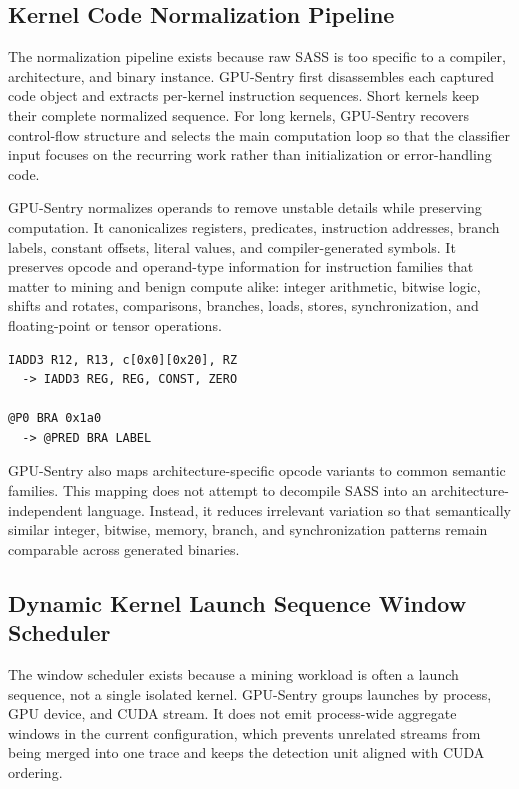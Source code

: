 \subsection{Kernel Code Normalization Pipeline}
\label{sec:normalization}

The normalization pipeline exists because raw SASS is too specific to a compiler, architecture, and binary instance. GPU-Sentry first disassembles each captured code object and extracts per-kernel instruction sequences. Short kernels keep their complete normalized sequence. For long kernels, GPU-Sentry recovers control-flow structure and selects the main computation loop so that the classifier input focuses on the recurring work rather than initialization or error-handling code.

GPU-Sentry normalizes operands to remove unstable details while preserving computation. It canonicalizes registers, predicates, instruction addresses, branch labels, constant offsets, literal values, and compiler-generated symbols. It preserves opcode and operand-type information for instruction families that matter to mining and benign compute alike: integer arithmetic, bitwise logic, shifts and rotates, comparisons, branches, loads, stores, synchronization, and floating-point or tensor operations.

\begin{lstlisting}[caption={Example of SASS normalization.},label={lst:normalization}]
IADD3 R12, R13, c[0x0][0x20], RZ
  -> IADD3 REG, REG, CONST, ZERO

@P0 BRA 0x1a0
  -> @PRED BRA LABEL
\end{lstlisting}

GPU-Sentry also maps architecture-specific opcode variants to common semantic families. This mapping does not attempt to decompile SASS into an architecture-independent language. Instead, it reduces irrelevant variation so that semantically similar integer, bitwise, memory, branch, and synchronization patterns remain comparable across generated binaries.

\subsection{Dynamic Kernel Launch Sequence Window Scheduler}
\label{sec:windows}

The window scheduler exists because a mining workload is often a launch sequence, not a single isolated kernel. GPU-Sentry groups launches by process, GPU device, and CUDA stream. It does not emit process-wide aggregate windows in the current configuration, which prevents unrelated streams from being merged into one trace and keeps the detection unit aligned with CUDA ordering.

